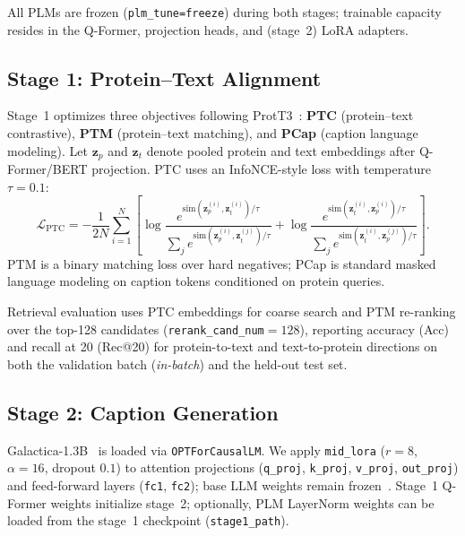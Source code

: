 \documentclass[conference]{IEEEtran}
\begin{document}
All PLMs are frozen (\texttt{plm\_tune=freeze}) during both stages; trainable capacity resides in the Q-Former, projection heads, and (stage~2) LoRA adapters.

\subsection{Stage 1: Protein--Text Alignment}

Stage~1 optimizes three objectives following ProtT3~\cite{liu2024prott3}:
\textbf{PTC} (protein--text contrastive), \textbf{PTM} (protein--text matching), and \textbf{PCap} (caption language modeling).
Let $\mathbf{z}_p$ and $\mathbf{z}_t$ denote pooled protein and text embeddings after Q-Former/BERT projection.
PTC uses an InfoNCE-style loss with temperature $\tau{=}0.1$:
\begin{equation}
  \mathcal{L}_{\text{PTC}} = -\frac{1}{2N}\sum_{i=1}^{N}\left[
    \log \frac{e^{\mathrm{sim}(\mathbf{z}_p^{(i)}, \mathbf{z}_t^{(i)})/\tau}}{\sum_j e^{\mathrm{sim}(\mathbf{z}_p^{(i)}, \mathbf{z}_t^{(j)})/\tau}}
    + \log \frac{e^{\mathrm{sim}(\mathbf{z}_t^{(i)}, \mathbf{z}_p^{(i)})/\tau}}{\sum_j e^{\mathrm{sim}(\mathbf{z}_t^{(i)}, \mathbf{z}_p^{(j)})/\tau}}
  \right].
\end{equation}
PTM is a binary matching loss over hard negatives; PCap is standard masked language modeling on caption tokens conditioned on protein queries.

Retrieval evaluation uses PTC embeddings for coarse search and PTM re-ranking over the top-128 candidates (\texttt{rerank\_cand\_num}${=}128$), reporting accuracy (Acc) and recall at 20 (Rec@20) for protein-to-text and text-to-protein directions on both the validation batch (\emph{in-batch}) and the held-out test set.

\subsection{Stage 2: Caption Generation}

Galactica-1.3B~\cite{taylor2022galactica} is loaded via \texttt{OPTForCausalLM}.
We apply \texttt{mid\_lora} ($r{=}8$, $\alpha{=}16$, dropout $0.1$) to attention projections (\texttt{q\_proj}, \texttt{k\_proj}, \texttt{v\_proj}, \texttt{out\_proj}) and feed-forward layers (\texttt{fc1}, \texttt{fc2}); base LLM weights remain frozen~\cite{hu2022lora}.
Stage~1 Q-Former weights initialize stage~2; optionally, PLM LayerNorm weights can be loaded from the stage~1 checkpoint (\texttt{stage1\_path}).
\end{document}
